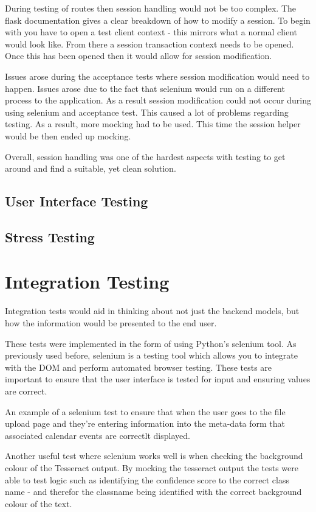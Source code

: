 During testing of routes then session handling would not be too complex. The flask documentation gives a clear breakdown of how to modify a session. To begin with you have to open a test client context - this mirrors what a normal client would look like. From there a session transaction context needs to be opened. Once this has been opened then it would allow for session modification.

Issues arose during the acceptance tests where session modification would need to happen. Issues arose due to the fact that selenium would run on a different process to the application. As a result session modification could not occur during using selenium and acceptance test. This caused a lot of problems regarding testing. As a result, more mocking had to be used. This time the session helper would be then ended up mocking.

Overall, session handling was one of the hardest aspects with testing to get around and find a suitable, yet clean solution.

\subsection{User Interface Testing}

\subsection{Stress Testing}

\section{Integration Testing}
Integration tests would aid in thinking about not just the backend models, but how the information would be presented to the end user.

These tests were implemented in the form of using Python's selenium tool. As previously used before, selenium is a testing tool which allows you to integrate with the DOM and perform automated browser testing. These tests are important to ensure that the user interface is tested for input and ensuring values are correct.

An example of a selenium test to ensure that when the user goes to the file upload page and they're entering information into the meta-data form that associated calendar events are correctlt displayed.

Another useful test where selenium works well is when checking the background colour of the Tesseract output. By mocking the tesseract output the tests were able to test logic such as identifying the confidence score to the correct class name - and therefor the classname being identified with the correct background colour of the text.
